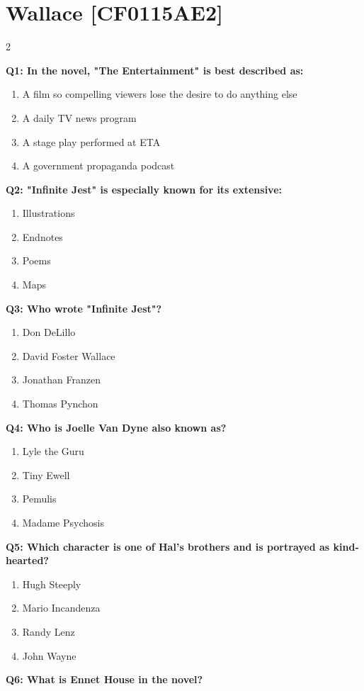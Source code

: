 \documentclass[10pt]{article}
\begin{document}
\section*{Wallace \footnotesize [CF0115AE2]}
\begin{multicols}{2}

\textbf{Q1: In the novel, "The Entertainment" is best described as:}

\begin{enumerate}[label=\arabic*.]
\item A film so compelling viewers lose the desire to do anything else
\item A daily TV news program
\item A stage play performed at ETA
\item A government propaganda podcast
\end{enumerate}
\textbf{Q2: "Infinite Jest" is especially known for its extensive:}

\begin{enumerate}[label=\arabic*.]
\item Illustrations
\item Endnotes
\item Poems
\item Maps
\end{enumerate}
\textbf{Q3: Who wrote "Infinite Jest"?}

\begin{enumerate}[label=\arabic*.]
\item Don DeLillo
\item David Foster Wallace
\item Jonathan Franzen
\item Thomas Pynchon
\end{enumerate}
\textbf{Q4: Who is Joelle Van Dyne also known as?}

\begin{enumerate}[label=\arabic*.]
\item Lyle the Guru
\item Tiny Ewell
\item Pemulis
\item Madame Psychosis
\end{enumerate}
\textbf{Q5: Which character is one of Hal's brothers and is portrayed as kind-hearted?}

\begin{enumerate}[label=\arabic*.]
\item Hugh Steeply
\item Mario Incandenza
\item Randy Lenz
\item John Wayne
\end{enumerate}
\textbf{Q6: What is Ennet House in the novel?}


\end{multicols}
\end{document}
